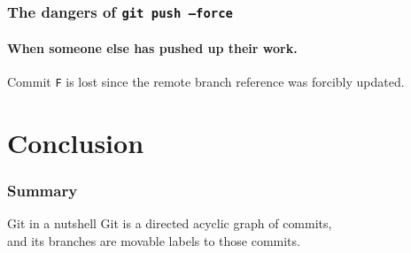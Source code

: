 \documentclass{beamer}
\newcommand\gitcmd[1]{\texttt{git #1}}
\newcommand\grefspec[1]{\texttt{#1}}
\begin{document}
\begin{frame}
  \frametitle{The dangers of \gitcmd{push --force}}
  \framesubtitle{When someone else has pushed up their work.}

  \begin{figure}
    \centering
  \end{figure}

  Commit \grefspec{F} is lost since the remote branch reference was forcibly updated.
\end{frame}

\section{Conclusion}

\begin{frame}
  \frametitle{Summary}
  \begin{block}{Git in a nutshell}
    Git is a directed acyclic graph of commits,\\
    and its branches are movable labels to those commits.
  \end{block}
\end{frame}
\end{document}
